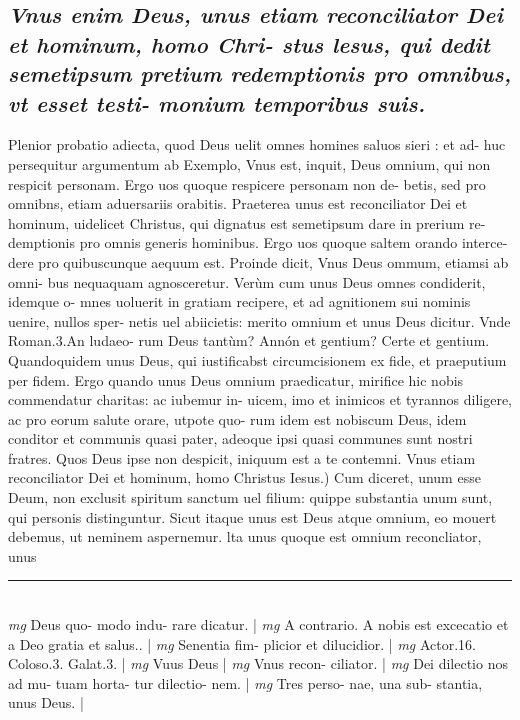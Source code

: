 \documentclass{article}
\begin{document}
\begin{pages}
\subsection*{\textit{Vnus enim Deus, unus etiam reconciliator Dei et hominum, homo Chri- stus lesus, qui dedit semetipsum pretium redemptionis pro omnibus, vt esset testi- monium temporibus suis. }}\pstart Plenior probatio adiecta, quod Deus uelit omnes homines saluos sieri : et ad- huc persequitur argumentum ab Exemplo, Vnus est, inquit, Deus omnium, qui non respicit personam. Ergo uos quoque respicere personam non de- betis, sed pro omnibns, etiam aduersariis orabitis. Praeterea unus est reconciliator Dei et hominum, uidelicet Christus, qui dignatus est semetipsum dare in prerium re- demptionis pro omnis generis hominibus. Ergo uos quoque saltem orando interce- dere pro quibuscunque aequum est. Proinde dicit, Vnus Deus ommum, etiamsi ab omni- bus nequaquam agnosceretur. Verùm cum unus Deus omnes condiderit, idemque  o- mnes uoluerit in gratiam recipere, et ad agnitionem sui nominis uenire, nullos sper- netis uel abiicietis: merito omnium et unus Deus dicitur. Vnde Roman.3.An ludaeo- rum Deus tantùm? Annón et gentium? Certe et gentium. Quandoquidem unus Deus, qui iustificabst circumcisionem ex fide, et praeputium per fidem. Ergo quando unus Deus omnium praedicatur, mirifice hic nobis commendatur charitas: ac iubemur in- uicem, imo et inimicos et tyrannos diligere, ac pro eorum salute orare, utpote quo- rum idem est nobiscum Deus, idem conditor et communis quasi pater, adeoque  ipsi quasi communes sunt nostri fratres. Quos Deus ipse non despicit, iniquum est a te contemni.  \pend\pstart Vnus etiam reconciliator Dei et hominum, homo Christus Iesus.) Cum diceret, unum esse Deum, non exclusit spiritum sanctum uel filium: quippe substantia unum sunt, qui personis distinguntur. Sicut itaque unus est Deus atque omnium, eo mouert debemus, ut neminem aspernemur. lta unus quoque est omnium reconcliator, unus  \pend
\vspace{0.5cm}\noindent
\vspace{0.2cm}\rule{1cm}{0.2pt}\\ 
\hspace{0.2cm}\textit{mg}
\footnotesize Deus quo- modo indu- rare dicatur. 
\normalsize| 
\hspace{0.2cm}\textit{mg}
\footnotesize A contrario. A nobis est excecatio et a Deo gratia et salus.. 
\normalsize| 
\hspace{0.2cm}\textit{mg}
\footnotesize Senentia fim- plicior et dilucidior. 
\normalsize| 
\hspace{0.2cm}\textit{mg}
\footnotesize Actor.16. Coloso.3. Galat.3. 
\normalsize| 
\hspace{0.2cm}\textit{mg}
\footnotesize Vuus Deus 
\normalsize| 
\hspace{0.2cm}\textit{mg}
\footnotesize Vnus recon- ciliator. 
\normalsize| 
\hspace{0.2cm}\textit{mg}
\footnotesize Dei dilectio nos ad mu- tuam horta- tur dilectio- nem. 
\normalsize| 
\hspace{0.2cm}\textit{mg}
\footnotesize Tres perso- nae, una sub- stantia, unus Deus. 
\normalsize| 

\end{pages}
\end{document}

